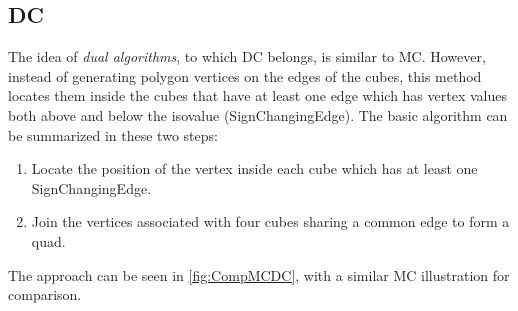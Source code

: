\subsection{\Acl{DC}}
\label{ssec:DC}
The idea of \emph{dual algorithms}, to which \acf{DC} belongs, is similar to \ac{MC}. However, instead of generating polygon vertices on the edges of the cubes, this method locates them inside the cubes that have at least one edge which has vertex values both above and below the isovalue (\acs{SignChangingEdge}). The basic algorithm can be summarized in these two steps:
\begin{enumerate}
\item Locate the position of the vertex inside each cube which has at least one \ac{SignChangingEdge}.
\item Join the vertices associated with four cubes sharing a common edge to form a \ac{quad}.
\end{enumerate}
The approach can be seen in \autoref{fig:CompMCDC}, with a similar \ac{MC} illustration for comparison.

